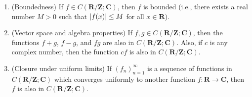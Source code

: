 \begin{lemma}\label{5.1.5}
    \quad
    \begin{enumerate}
        \item (Boundedness)
              If \(f \in C(\mathbf{R} / \mathbf{Z} ; \mathbf{C})\), then \(f\) is bounded
              (i.e., there exists a real number \(M > 0\) such that \(\abs*{f(x)} \leq M\) for all \(x \in \mathbf{R}\)).
        \item (Vector space and algebra properties)
              If \(f, g \in C(\mathbf{R} / \mathbf{Z} ; \mathbf{C})\), then the functions \(f + g\), \(f - g\), and \(f g\) are also in \(C(\mathbf{R} / \mathbf{Z} ; \mathbf{C})\).
              Also, if \(c\) is any complex number, then the function \(cf\) is also in \(C(\mathbf{R} / \mathbf{Z} ; \mathbf{C})\).
        \item (Closure under uniform limits)
              If \((f_n)_{n = 1}^\infty\) is a sequence of functions in \(C(\mathbf{R} / \mathbf{Z} ; \mathbf{C})\) which converges uniformly to another function \(f : \mathbf{R} \to \mathbf{C}\), then \(f\) is also in \(C(\mathbf{R} / \mathbf{Z} ; \mathbf{C})\).
    \end{enumerate}
\end{lemma}

